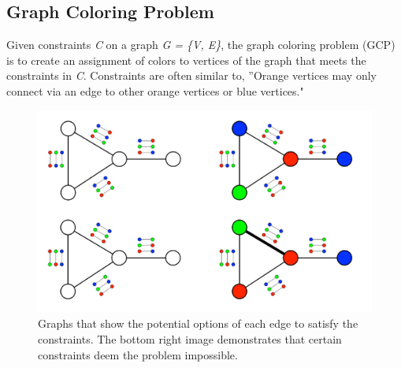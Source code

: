 \documentclass[10pt,twoside]{IEEEtran}
\begin{document}


\subsection{Graph Coloring Problem}
Given constraints \emph{C} on a graph \emph{G = \{V, E\}}, the graph coloring problem (GCP) is to create an assignment of colors to vertices of the graph that meets the constraints in \emph{C}. Constraints are often similar to, ''Orange vertices may only connect via an edge to other orange vertices or blue vertices."

\begin{figure}[h]
	\centering
	\includegraphics[width=0.7\linewidth]{../diagrams/GCP.jpg}
	\caption{Graphs that show the potential options of each edge to satisfy the constraints. The bottom right image demonstrates that certain constraints deem the problem impossible.}
	\label{GCP Fig}
\end{figure}
\end{document}
